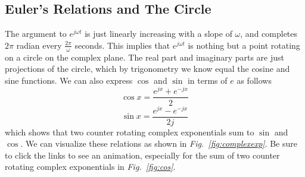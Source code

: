 \subsection{Euler's Relations and The Circle}
The argument to $e^{j \omega t}$ is just linearly increasing with a slope of $\omega$, and completes $2\pi$ radian every $\frac{2\pi}{\omega}$ seconds.  This implies that $e^{j \omega t}$ is nothing but a point rotating on a circle on the complex plane.  The real part and imaginary parts are just projections of the circle, which by trigonometry we know equal the cosine and sine functions.
 We can also express $\cos$ and $\sin$ in terms of $e$ as follows
    \begin{equation}
        \cos x = \frac{e^{jx} + e^{-jx}}{2}
    \end{equation}
    \begin{equation}
        \sin x = \frac{e^{jx} - e^{-jx}}{2j}
    \end{equation}
which shows that two counter rotating complex exponentials sum to $\sin$ and $\cos$.  We can visualize these relations as shown in \emph{Fig.~\ref{fig:complexexp}}.  Be sure to click the links to see an animation, especially for the sum of two counter rotating complex exponentials in \emph{Fig.~\ref{fig:cos}}.
